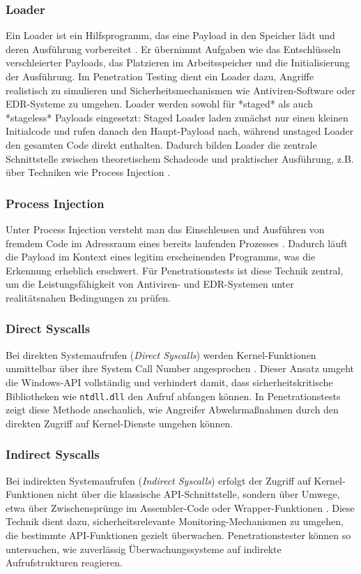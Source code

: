 \subsubsection{Loader}
Ein Loader ist ein Hilfsprogramm, das eine Payload in den Speicher lädt und deren Ausführung vorbereitet \cite{metasploit_stageless, bernardinetti2023_edr}. Er übernimmt Aufgaben wie das Entschlüsseln verschleierter Payloads, das Platzieren im Arbeitsspeicher und die Initialisierung der Ausführung. Im Penetration Testing dient ein Loader dazu, Angriffe realistisch zu simulieren und Sicherheitsmechanismen wie Antiviren-Software oder EDR-Systeme zu umgehen.  
Loader werden sowohl für *staged* als auch *stageless* Payloads eingesetzt: Staged Loader laden zunächst nur einen kleinen Initialcode und rufen danach den Haupt-Payload nach, während unstaged Loader den gesamten Code direkt enthalten. Dadurch bilden Loader die zentrale Schnittstelle zwischen theoretischem Schadcode und praktischer Ausführung, z.B. über Techniken wie Process Injection .
\subsubsection{Process Injection}
Unter Process Injection versteht man das Einschleusen und Ausführen von fremdem Code im Adressraum eines bereits laufenden Prozesses \cite{mitre_t1055}. Dadurch läuft die Payload im Kontext eines legitim erscheinenden Programms, was die Erkennung erheblich erschwert. Für Penetrationstests ist diese Technik zentral, um die Leistungsfähigkeit von Antiviren- und EDR-Systemen unter realitätsnahen Bedingungen zu prüfen.
\subsubsection{Direct Syscalls}
Bei direkten Systemaufrufen (\textit{Direct Syscalls}) werden Kernel-Funktionen unmittelbar über ihre System Call Number angesprochen \cite{forshaw_projectzero}. Dieser Ansatz umgeht die Windows-API vollständig und verhindert damit, dass sicherheitskritische Bibliotheken wie \texttt{ntdll.dll} den Aufruf abfangen können. In Penetrationstests zeigt diese Methode anschaulich, wie Angreifer Abwehrmaßnahmen durch den direkten Zugriff auf Kernel-Dienste umgehen können.
\subsubsection{Indirect Syscalls}
Bei indirekten Systemaufrufen (\textit{Indirect Syscalls}) erfolgt der Zugriff auf Kernel-Funktionen nicht über die klassische API-Schnittstelle, sondern über Umwege, etwa über Zwischensprünge im Assembler-Code oder Wrapper-Funktionen \cite{forshaw_projectzero}. Diese Technik dient dazu, sicherheitsrelevante Monitoring-Mechanismen zu umgehen, die bestimmte API-Funktionen gezielt überwachen. Penetrationstester können so untersuchen, wie zuverlässig Überwachungssysteme auf indirekte Aufrufstrukturen reagieren.
